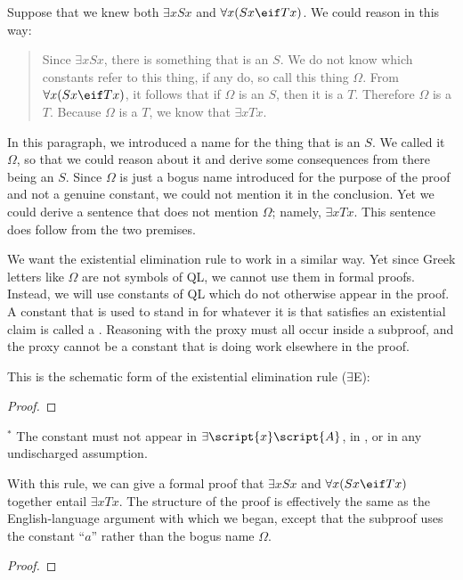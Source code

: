 Suppose that we knew both $\exists x Sx$ and $\forall x(Sx \eif Tx)$. We could reason in this way:
\begin{quote}
Since $\exists x Sx$, there is something that is an $S$. We do not know which constants refer to this thing, if any do, so call this thing $\Omega$. From $\forall x(Sx \eif Tx)$, it follows that if $\Omega$ is an $S$, then it is a $T$. Therefore $\Omega$ is a $T$.  Because $\Omega$ is a $T$, we know that $\exists x Tx$.
\end{quote}
In this paragraph, we introduced a name for the thing that is an $S$. We called it $\Omega$, so that we could reason about it and derive some consequences from there being an $S$. Since $\Omega$ is just a bogus name introduced for the purpose of the proof and not a genuine constant, we could not mention it in the conclusion. Yet we could derive a sentence that does not mention $\Omega$; namely, $\exists x Tx$. This sentence does follow from the two premises.

We want the existential elimination rule to work in a similar way. Yet since Greek letters like $\Omega$ are not symbols of QL, we cannot use them in formal proofs. Instead, we will use constants of QL which do not otherwise appear in the proof. A constant that is used to stand in for whatever it is that satisfies an existential claim is called a . Reasoning with the proxy must all occur inside a subproof, and the proxy cannot be a constant that is doing work elsewhere in the proof.

This is the schematic form of the existential elimination rule ($\exists$E): 

\begin{proof}
	\open	
	\close
	 
\end{proof}
$^\ast$ The constant  must not appear in $\exists\script{x}\script{A}$, in , or in any undischarged assumption.

With this rule, we can give a formal proof that $\exists x Sx$ and $\forall x(Sx \eif Tx)$ together entail $\exists x Tx$. The structure of the proof is effectively the same as the English-language argument with which we began, except that the subproof uses the constant ``$a$'' rather than the bogus name $\Omega$.

\begin{proof}
	\open
		 
	\close
\end{proof}

